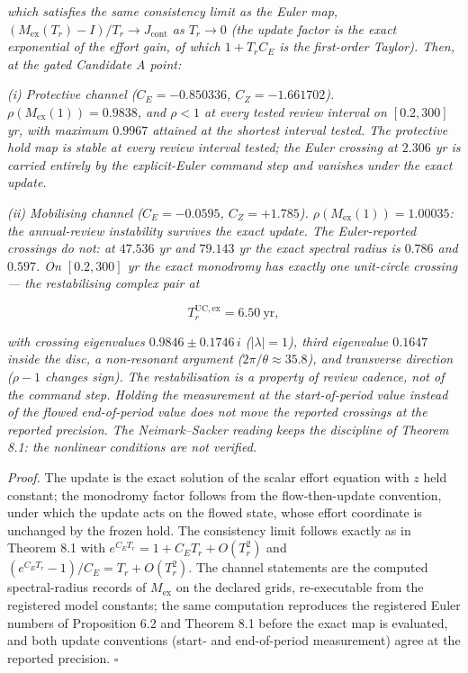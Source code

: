 \documentclass[11pt]{article}
\begin{document}
\emph{which satisfies the same consistency limit as the Euler map,
\((M_{\mathrm{ex}}(T_r) - I)/T_r \to J_{\mathrm{cont}}\) as
\(T_r \to 0\) (the update factor is the exact exponential of the effort
gain, of which \(1 + T_r C_E\) is the first-order Taylor). Then, at the
gated Candidate A point:}

\emph{(i) Protective channel (\(C_E = -0.850336\), \(C_Z = -1.661702\)).
\(\rho(M_{\mathrm{ex}}(1)) = 0.9838\), and \(\rho < 1\) at every tested
review interval on \([0.2, 300]\) yr, with maximum \(0.9967\) attained
at the shortest interval tested. The protective hold map is stable at
every review interval tested; the Euler crossing at \(2.306\) yr is
carried entirely by the explicit-Euler command step and vanishes under
the exact update.}

\emph{(ii) Mobilising channel (\(C_E = -0.0595\), \(C_Z = +1.785\)).
\(\rho(M_{\mathrm{ex}}(1)) = 1.00035\): the annual-review instability
survives the exact update. The Euler-reported crossings do not: at
\(47.536\) yr and \(79.143\) yr the exact spectral radius is \(0.786\)
and \(0.597\). On \([0.2, 300]\) yr the exact monodromy has exactly one
unit-circle crossing --- the restabilising complex pair at}

\[T_r^{\mathrm{UC,ex}} = 6.50\ \mathrm{yr},\]

\emph{with crossing eigenvalues \(0.9846 \pm 0.1746\,i\)
(\(|\lambda| = 1\)), third eigenvalue \(0.1647\) inside the disc, a
non-resonant argument (\(2\pi/\theta \approx 35.8\)), and transverse
direction (\(\rho - 1\) changes sign). The restabilisation is a property
of review cadence, not of the command step. Holding the measurement at
the start-of-period value instead of the flowed end-of-period value does
not move the reported crossings at the reported precision. The
Neimark--Sacker reading keeps the discipline of Theorem 8.1: the
nonlinear conditions are not verified.}

\emph{Proof.} The update is the exact solution of the scalar effort
equation with \(z\) held constant; the monodromy factor follows from the
flow-then-update convention, under which the update acts on the flowed
state, whose effort coordinate is unchanged by the frozen hold. The
consistency limit follows exactly as in Theorem 8.1 with
\(e^{C_E T_r} = 1 + C_E T_r + O(T_r^2)\) and
\((e^{C_E T_r} - 1)/C_E = T_r + O(T_r^2)\). The channel statements are
the computed spectral-radius records of \(M_{\mathrm{ex}}\) on the
declared grids, re-executable from the registered model constants; the
same computation reproduces the registered Euler numbers of Proposition
6.2 and Theorem 8.1 before the exact map is evaluated, and both update
conventions (start- and end-of-period measurement) agree at the reported
precision. \ensuremath{\square}
\end{document}
